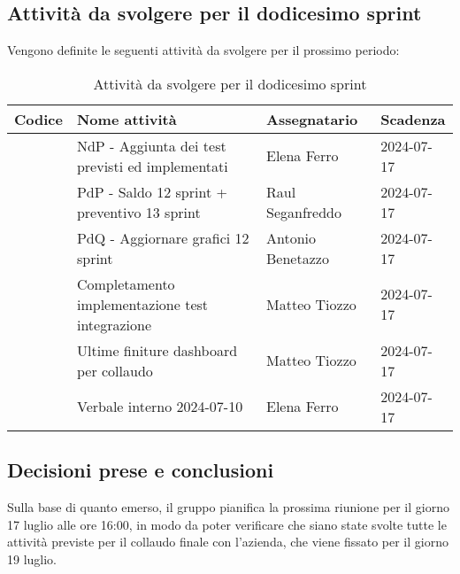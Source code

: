 \documentclass[italian,12pt]{article}
\begin{document}
\newpage

\subsection{Attività da svolgere per il dodicesimo sprint}
Vengono definite le seguenti attività da svolgere per il prossimo periodo:
\begin{table}[!h]
	\centering
	\begin{tabular}{ |l||p{7cm}|l|l| }
		\hline
		\textbf{Codice}    & \textbf{Nome attività}                           & \textbf{Assegnatario} & \textbf{Scadenza} \\
		\hline
		\mySkip[86bz8e29k] & NdP - Aggiunta dei test previsti ed implementati & Elena Ferro           & 2024-07-17        \\
		\mySkip[86bz8e6dg] & PdP - Saldo 12 sprint + preventivo 13 sprint     & Raul Seganfreddo      & 2024-07-17        \\
		\mySkip[86bz0pf93] & PdQ - Aggiornare grafici 12 sprint               & Antonio Benetazzo     & 2024-07-17        \\
		\mySkip[86byzyxt4] & Completamento implementazione test integrazione  & Matteo Tiozzo         & 2024-07-17        \\
		\mySkip[86bzjkpg8] & Ultime finiture dashboard per collaudo           & Matteo Tiozzo         & 2024-07-17        \\
		\mySkip[86bzjkpy4] & Verbale interno 2024-07-10                       & Elena Ferro           & 2024-07-17        \\
		\hline
	\end{tabular}
	\caption{Attività da svolgere per il dodicesimo sprint}
\end{table}

\subsection{Decisioni prese e conclusioni}
Sulla base di quanto emerso, il gruppo pianifica la prossima riunione per il giorno 17 luglio alle ore 16:00, in modo da poter verificare che siano state svolte tutte le attività previste per il collaudo finale con l'azienda, che viene fissato per il giorno 19 luglio.
\end{document}

